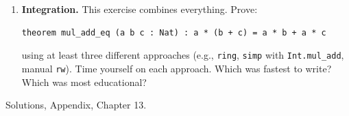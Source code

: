 \begin{enumerate}
  Now prove \texttt{a + 0 + 0 = a} using these lemmas. Then prove \texttt{0 + a + 0 = a}. Which lemmas did you need? Write a general lemma \texttt{add\_\allowbreak{}zeros (a : Nat) : a + 0 + 0 = a} that works for any \texttt{a}.
\item
  \textbf{Integration.} This exercise combines everything. Prove:

\begin{lstlisting}
theorem mul_add_eq (a b c : Nat) : a * (b + c) = a * b + a * c
\end{lstlisting}

  using at least three different approaches (e.g., \texttt{ring}, \texttt{simp} with \texttt{Int.mul\_\allowbreak{}add}, manual \texttt{rw}). Time yourself on each approach. Which was fastest to write? Which was most educational?
\end{enumerate}

Solutions, Appendix, Chapter 13.
